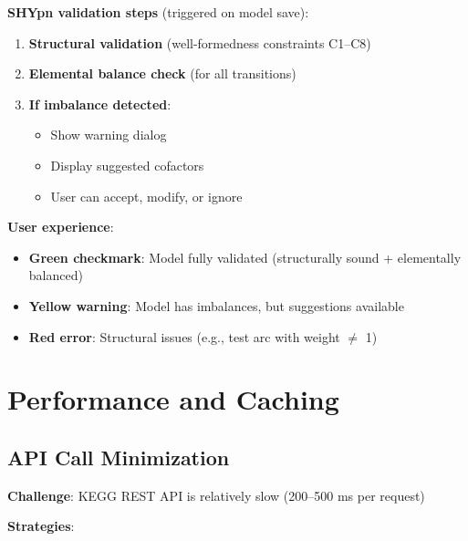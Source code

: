 \textbf{SHYpn validation steps} (triggered on model save):

\begin{enumerate}
    \item \textbf{Structural validation} (well-formedness constraints C1--C8)
    \item \textbf{Elemental balance check} (for all transitions)
    \item \textbf{If imbalance detected}:
    \begin{itemize}
        \item Show warning dialog
        \item Display suggested cofactors
        \item User can accept, modify, or ignore
    \end{itemize}
\end{enumerate}

\textbf{User experience}:

\begin{itemize}
    \item \textbf{Green checkmark}: Model fully validated (structurally sound + elementally balanced)
    \item \textbf{Yellow warning}: Model has imbalances, but suggestions available
    \item \textbf{Red error}: Structural issues (e.g., test arc with weight $\neq$ 1)
\end{itemize}

\section{Performance and Caching}
\label{sec:kegg-performance}

\subsection{API Call Minimization}
\label{subsec:kegg-api-minimization}

\textbf{Challenge}: KEGG REST API is relatively slow (200--500 ms per request)

\textbf{Strategies}:

